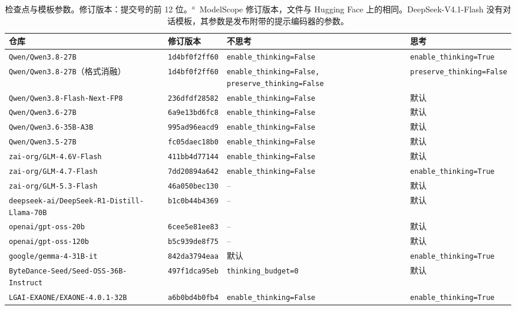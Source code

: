 \begin{table}[htbp]
\centering
\caption{检查点与模板参数。修订版本：提交号的前 12 位。$^{a}$~ModelScope 修订版本，文件与 Hugging Face 上的相同。DeepSeek-V4.1-Flash 没有对话模板，其参数是发布附带的提示编码器的参数。}
\label{tab:self_config}
\scriptsize
\setlength{\tabcolsep}{2.5pt}
\begin{tabular}{llp{3.2cm}p{3.5cm}}
\toprule
仓库 & 修订版本 & 不思考 & 思考 \\
\midrule
\texttt{Qwen/Qwen3.8-27B} & \texttt{1d4bf0f2ff60} & \texttt{enable\_thinking=False} & \texttt{enable\_thinking=True} \\
\texttt{Qwen/Qwen3.8-27B}（格式消融） & \texttt{1d4bf0f2ff60} & \texttt{enable\_thinking=\allowbreak False, preserve\_thinking=\allowbreak False} & \texttt{preserve\_thinking=False} \\
\texttt{Qwen/Qwen3.8-Flash-Next-FP8} & \texttt{236dfdf28582} & \texttt{enable\_thinking=False} & 默认 \\
\texttt{Qwen/Qwen3.6-27B} & \texttt{6a9e13bd6fc8} & \texttt{enable\_thinking=False} & 默认 \\
\texttt{Qwen/Qwen3.6-35B-A3B} & \texttt{995ad96eacd9} & \texttt{enable\_thinking=False} & 默认 \\
\texttt{Qwen/Qwen3.5-27B} & \texttt{fc05daec18b0} & \texttt{enable\_thinking=False} & 默认 \\
\texttt{zai-org/GLM-4.6V-Flash} & \texttt{411bb4d77144} & \texttt{enable\_thinking=False} & 默认 \\
\texttt{zai-org/GLM-4.7-Flash} & \texttt{7dd20894a642} & \texttt{enable\_thinking=False} & \texttt{enable\_thinking=True} \\
\texttt{zai-org/GLM-5.3-Flash} & \texttt{46a050bec130} & -- & 默认 \\
\texttt{deepseek-ai/DeepSeek-R1-Distill-Llama-70B} & \texttt{b1c0b44b4369} & -- & 默认 \\
\texttt{openai/gpt-oss-20b} & \texttt{6cee5e81ee83} & -- & 默认 \\
\texttt{openai/gpt-oss-120b} & \texttt{b5c939de8f75} & -- & 默认 \\
\texttt{google/gemma-4-31B-it} & \texttt{842da3794eaa} & 默认 & \texttt{enable\_thinking=True} \\
\texttt{ByteDance-Seed/Seed-OSS-36B-Instruct} & \texttt{497f1dca95eb} & \texttt{thinking\_budget=0} & 默认 \\
\texttt{LGAI-EXAONE/EXAONE-4.0.1-32B} & \texttt{a6b0bd4b0fb4} & \texttt{enable\_thinking=False} & \texttt{enable\_thinking=True} \\

\end{tabular}
\end{table}
